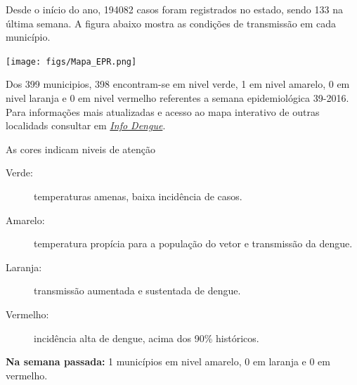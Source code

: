 \documentclass[10pt]{article} %
\begin{document}
\begin{minipage}[t]{.66\linewidth} %

\hypertarget{estado}{} %

Desde o início do ano, 194082 casos foram registrados no estado, sendo 133 na última semana. A figura abaixo mostra as condições de transmissão em cada município.

\texttt{[image: figs/Mapa\_EPR.png]}

Dos 399 municipios, 398 encontram-se em nivel verde, 1 em nivel amarelo, 0 em nivel laranja e 0 em nivel vermelho referentes a semana epidemiológica 39-2016. Para informações mais atualizadas e acesso ao mapa interativo de outras localidads consultar em \href{http://info.dengue.mat.br}{\textit{Info Dengue}}.


\vspace{1cm}
\begin{mdframed}[style=intextbox,frametitle={}] %

\hypertarget{descriptivebox}{} %
As cores indicam niveis de atenção
\begin{description}
\item[Verde:] temperaturas amenas, baixa incidência de casos.      
\item[Amarelo:] temperatura propícia para a população do vetor e transmissão da dengue.
\item[Laranja:] transmissão aumentada e sustentada de dengue. 
\item[Vermelho:] incidência alta de dengue, acima dos 90\% históricos.
\end{description}
\end{mdframed}

 \textbf{Na semana passada:} 1 municípios em nivel amarelo, 0 em laranja e 0 em vermelho.    

\end{minipage} %
\end{document}
